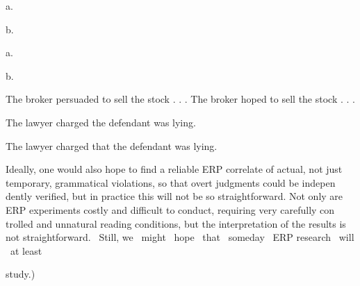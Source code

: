 \begin{multicols}{2}
\setcounter{listWWNumlivleveli}{0}
\begin{listWWNumlivleveli}
\item 
\begin{styleStandard}
a.
\end{styleStandard}


\end{listWWNumlivleveli}
\begin{styleStandard}
b.
\end{styleStandard}


\begin{listWWNumlivleveli}
\item 
\begin{styleStandard}
a.
\end{styleStandard}


\end{listWWNumlivleveli}
\begin{styleStandard}
b.
\end{styleStandard}


\begin{styleStandard}
The broker persuaded to sell the stock . . . The broker hoped to sell the stock . . .
\end{styleStandard}


\begin{styleStandard}
The lawyer charged the defendant was lying.
\end{styleStandard}


\begin{styleStandard}
The lawyer charged that the defendant was lying.
\end{styleStandard}


\end{multicols}
\begin{styleStandard}
Ideally, one would also hope to find a reliable ERP correlate of actual, not just temporary, grammatical violations, so that overt judgments could be indepen\- dently verified, but in practice this will not be so straightforward. Not only are ERP experiments costly and difficult to conduct, requiring very carefully con\- trolled and unnatural reading conditions, but the interpretation of the results is not straightforward. \ Still, we \ might \ hope \ that \ someday \ ERP research \ will \ at least
\end{styleStandard}


\begin{styleStandard}
study.)
\end{styleStandard}


